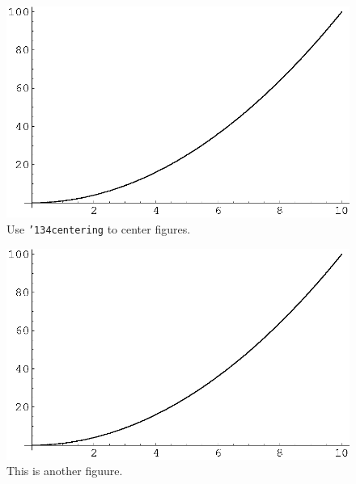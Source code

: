 
\begin{figure}[h]
  \centering
  \includegraphics{images/plot.eps}
  \caption{Use {\tt \char'134centering\/} to center figures.}
  \label{fi:centered}
\end{figure}


\begin{figure}[h]
  \centering
  \includegraphics{images/plot.eps}
  \caption{This is another figuure.}
  \label{fi:another}
\end{figure}


